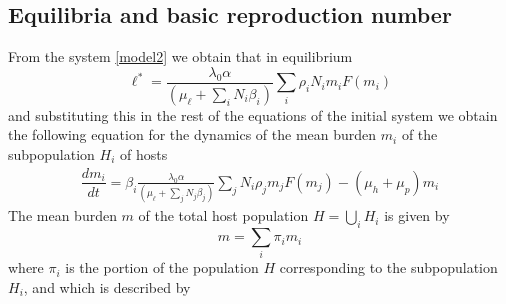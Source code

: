 \documentclass[12pt,a4paper]{article}
\theoremstyle{plain}%
\theoremstyle{definition}
\theoremstyle{remark}
\begin{document}
\subsection{Equilibria and basic reproduction number} 
From the system \eqref{model2} we obtain that in equilibrium
\begin{equation}
	\ell^*=\frac{  \lambda_0 \alpha }{(\mu_{\ell}+\sum_i N_i \beta_i  )}   \sum_i \rho_{i} N_{i} m_{i} F(m_{i}) 
\end{equation} 
and substituting this in the rest of the equations of the initial system we obtain the following equation for the dynamics of the mean burden $m_{i}$ of the subpopulation $H_{i}$ of hosts
\begin{equation}
	\begin{split}
		\dfrac{dm_{i}}{dt}=\beta_{i} \frac{\lambda_0\alpha}{ (\mu_{\ell}+\sum_j N_j \beta_j  ) }  
		\sum_j    N_i \rho_{j}  m_{j} F(m_{j})  - (\mu_h+\mu_p) m_{i}%
	\end{split}
\end{equation}
The mean burden $m$ of the total host population $H=\bigcup_i H_i$ is given by
\begin{equation}
	m=\sum_i \pi_i m_{i} 
\end{equation}
where $\pi_i$ is the portion of the population $H$ corresponding to the subpopulation $H_i$, and which is described by
\end{document}
